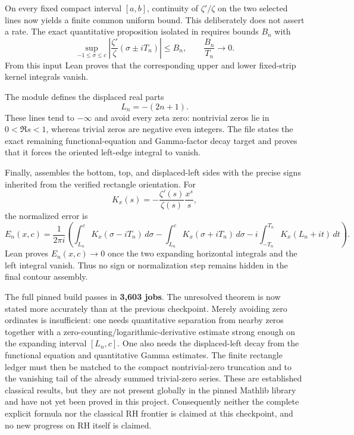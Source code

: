 \documentclass[11pt,a4paper]{article}
\begin{document}
On every fixed compact interval $[a,b]$, continuity of $\zeta'/\zeta$ on the
two selected lines now yields a finite common uniform bound.  This deliberately
does not assert a rate.  The exact quantitative proposition isolated in
 requires bounds $B_n$ with
\[
  \sup_{-1\leq\sigma\leq c}
  \left|\frac{\zeta'}{\zeta}(\sigma\mathbin{\pm}iT_n)\right|
  \leq B_n,
  \qquad \frac{B_n}{T_n}\longrightarrow0.
\]
From this input Lean proves that the corresponding upper and lower
fixed-strip kernel integrals vanish.

The module  defines the
displaced real parts
\[
  L_n=-(2n+1).
\]
These lines tend to $-\infty$ and avoid every zeta zero: nontrivial zeros lie
in $0<\Re s<1$, whereas trivial zeros are negative even integers.  The file
states the exact remaining functional-equation and Gamma-factor decay target
and proves that it forces the oriented left-edge integral to vanish.

Finally,  assembles the
bottom, top, and displaced-left sides with the precise signs inherited from
the verified rectangle orientation.  For
\[
  K_x(s)=-\frac{\zeta'(s)}{\zeta(s)}\frac{x^s}{s},
\]
the normalized error is
\[
 E_n(x,c)=\frac{1}{2\pi i}\left(
   \int_{L_n}^{c}K_x(\sigma-iT_n)\,d\sigma
  -\int_{L_n}^{c}K_x(\sigma+iT_n)\,d\sigma
  -i\int_{-T_n}^{T_n}K_x(L_n+it)\,dt\right).
\]
Lean proves $E_n(x,c)\to0$ once the two expanding horizontal integrals and the
left integral vanish.  Thus no sign or normalization step remains hidden in
the final contour assembly.

The full pinned build passes in \textbf{3,603 jobs}.  The unresolved theorem is
now stated more accurately than at the previous checkpoint.  Merely avoiding
zero ordinates is insufficient: one needs quantitative separation from nearby
zeros together with a zero-counting/logarithmic-derivative estimate strong
enough on the expanding interval $[L_n,c]$.  One also needs the displaced-left
decay from the functional equation and quantitative Gamma estimates.  The
finite rectangle ledger must then be matched to the compact nontrivial-zero
truncation and to the vanishing tail of the already summed trivial-zero series.
These are established classical results, but they are not present globally in
the pinned Mathlib library and have not yet been proved in this project.
Consequently neither the complete explicit formula nor the classical RH
frontier is claimed at this checkpoint, and no new progress on RH itself is
claimed.
\end{document}
